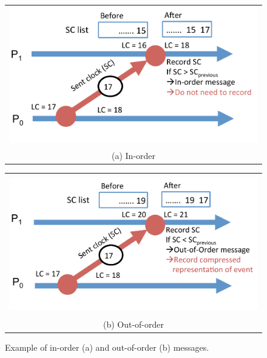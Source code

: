 \begin{figure}[!htb]
\centering
{}
\begin{tabular}{c}
\includegraphics[width=\textwidth,
  height=6cm]{chapter_3_figures/inorder.pdf} \\ (a) In-order \\
\end{tabular}
\endminipage
{}
\begin{tabular}{c}
\includegraphics[width=\textwidth,
  height=6cm]{chapter_3_figures/outoforder.pdf} \\ (b) Out-of-order\\
\end{tabular}
\endminipage
\caption{Example of in-order (a) and out-of-order (b) messages.}
\label{fig:inandout}
\end{figure}

